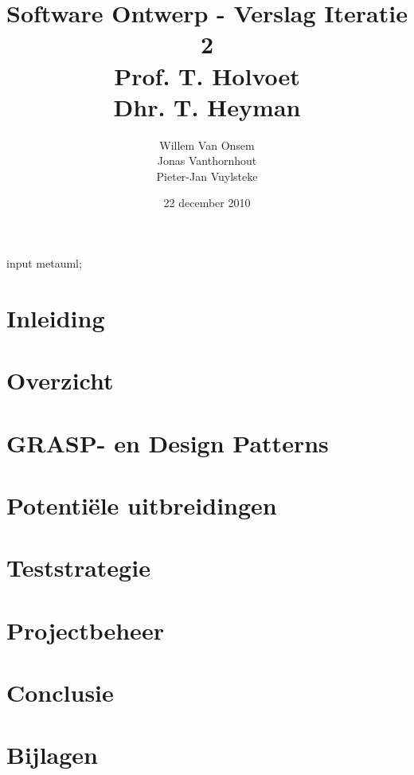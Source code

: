 \documentclass[a4paper,titlepage]{article}
\title{Software Ontwerp - Verslag Iteratie 2\\Prof. T. Holvoet\\Dhr. T. Heyman}
\author{Willem Van Onsem\\Jonas Vanthornhout\\Pieter-Jan Vuylsteke}
\date{22 december 2010}
\begin{document}
\begin{empfile}
\begin{empcmds}
input metauml;
\end{empcmds}
\begin{titlepage}
\maketitle
\end{titlepage}
\tableofcontents
\newpage
\section*{Inleiding}

\newpage
\section{Overzicht}

\newpage
\section{GRASP- en Design Patterns}

\newpage
\section{Potenti\"ele uitbreidingen}

\newpage
\section{Teststrategie}

\newpage
\section{Projectbeheer}

\newpage
\section{Conclusie}

\newpage
\appendix
\section{Bijlagen}


\end{empfile}
\end{document}
